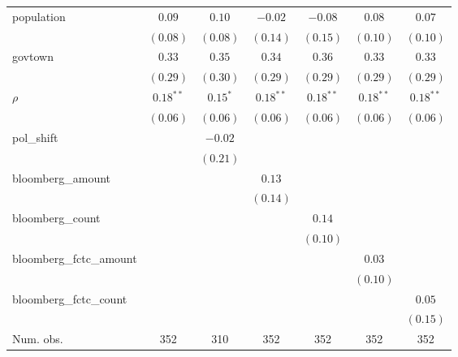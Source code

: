 \begin{table}[!h]
\begin{center}
\begin{tabular}{l c c c c c c }
population              & $0.09$       & $0.10$       & $-0.02$      & $-0.08$      & $0.08$       & $0.07$       \\
                        & $(0.08)$     & $(0.08)$     & $(0.14)$     & $(0.15)$     & $(0.10)$     & $(0.10)$     \\
govtown                 & $0.33$       & $0.35$       & $0.34$       & $0.36$       & $0.33$       & $0.33$       \\
                        & $(0.29)$     & $(0.30)$     & $(0.29)$     & $(0.29)$     & $(0.29)$     & $(0.29)$     \\
$\rho$                  & $0.18^{**}$  & $0.15^{*}$   & $0.18^{**}$  & $0.18^{**}$  & $0.18^{**}$  & $0.18^{**}$  \\
                        & $(0.06)$     & $(0.06)$     & $(0.06)$     & $(0.06)$     & $(0.06)$     & $(0.06)$     \\
pol\_shift              &              & $-0.02$      &              &              &              &              \\
                        &              & $(0.21)$     &              &              &              &              \\
bloomberg\_amount       &              &              & $0.13$       &              &              &              \\
                        &              &              & $(0.14)$     &              &              &              \\
bloomberg\_count        &              &              &              & $0.14$       &              &              \\
                        &              &              &              & $(0.10)$     &              &              \\
bloomberg\_fctc\_amount &              &              &              &              & $0.03$       &              \\
                        &              &              &              &              & $(0.10)$     &              \\
bloomberg\_fctc\_count  &              &              &              &              &              & $0.05$       \\
                        &              &              &              &              &              & $(0.15)$     \\
\midrule
Num. obs.               & 352          & 310          & 352          & 352          & 352          & 352          \\

\end{tabular}
\end{center}
\end{table}
